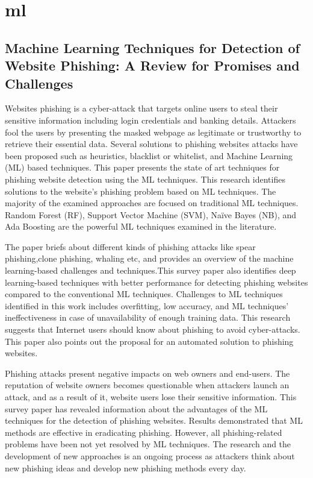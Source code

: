 \section{ml}

\subsection{Machine Learning Techniques for Detection of Website Phishing: A Review for Promises and Challenges}

Websites phishing is a cyber-attack that targets online users to steal their sensitive information including login credentials and banking details. Attackers fool the users by presenting the masked webpage as legitimate or trustworthy to retrieve their essential data. Several solutions to phishing websites attacks have been proposed such as heuristics, blacklist or whitelist, and Machine Learning (ML) based techniques. This paper presents the state of art techniques for phishing website detection using the ML techniques. This research identifies solutions to the website's phishing problem based on ML techniques. The majority of the examined approaches are focused on traditional ML techniques. Random Forest (RF), Support Vector Machine (SVM), Naïve Bayes (NB), and Ada Boosting are the powerful ML techniques examined in the literature.

The paper briefs about different kinds of phishing attacks like spear phishing,clone phishing, whaling etc, and provides an overview of the machine learning-based challenges and techniques.This survey paper also identifies deep learning-based techniques with better performance for detecting phishing websites compared to the conventional ML techniques. Challenges to ML techniques identified in this work includes overfitting, low accuracy, and ML techniques' ineffectiveness in case of unavailability of enough training data. This research suggests that Internet users should know about phishing to avoid cyber-attacks. This paper also points out the proposal for an automated solution to phishing websites.

Phishing attacks present negative impacts on web owners and end-users. The reputation of website owners becomes questionable when attackers launch an attack, and as a result of it, website users lose their sensitive information. This survey paper has revealed information about the advantages of the ML techniques for the detection of phishing websites. Results demonstrated that ML methods are effective in eradicating phishing. However, all phishing-related problems have been not yet resolved by ML techniques. The research and the development of new approaches is an ongoing process as attackers think about new phishing ideas and develop new phishing methods every day.

